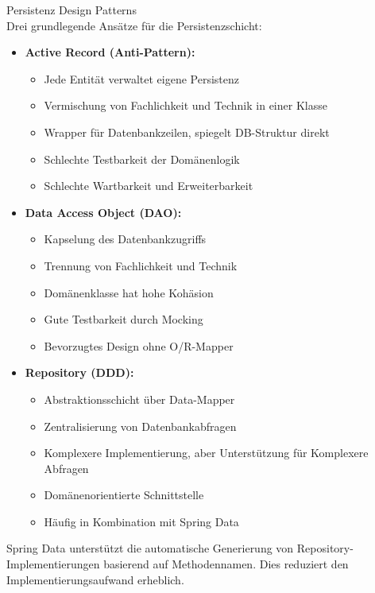 \begin{theorem}{Persistenz Design Patterns}\\
Drei grundlegende Ansätze für die Persistenzschicht:
\begin{itemize}
    \item \textbf{Active Record (Anti-Pattern):}
    \begin{itemize}
        \item Jede Entität verwaltet eigene Persistenz
        \item Vermischung von Fachlichkeit und Technik in einer Klasse
        \item Wrapper für Datenbankzeilen, spiegelt DB-Struktur direkt
        \item Schlechte Testbarkeit der Domänenlogik
        \item Schlechte Wartbarkeit und Erweiterbarkeit
    \end{itemize}
    \item \textbf{Data Access Object (DAO):}
    \begin{itemize}
        \item Kapselung des Datenbankzugriffs
        \item Trennung von Fachlichkeit und Technik
        \item Domänenklasse hat hohe Kohäsion
        \item Gute Testbarkeit durch Mocking
        \item Bevorzugtes Design ohne O/R-Mapper
    \end{itemize}
    \item \textbf{Repository (DDD):}
    \begin{itemize}
        \item Abstraktionsschicht über Data-Mapper
        \item Zentralisierung von Datenbankabfragen
        \item Komplexere Implementierung, aber Unterstützung für Komplexere Abfragen
        \item Domänenorientierte Schnittstelle
        \item Häufig in Kombination mit Spring Data
    \end{itemize}
\end{itemize}
\end{theorem}

\begin{remark}
    Spring Data unterstützt die automatische Generierung von Repository-Implementierungen basierend auf Methodennamen. Dies reduziert den Implementierungsaufwand erheblich.
\end{remark}


